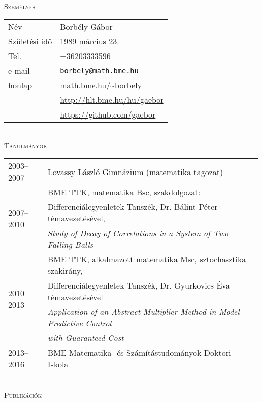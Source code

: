 \documentclass[12pt]{article}
\newcommand\mail[1]{\href{mailto:#1}{\texttt{#1}}}
\begin{document}
{ \ }
\\
\textsc{Személyes}
 \vspace{0.3cm}
 \\
       \begin{tabular}{p{3.5cm}l}
	       Név & Borbély Gábor \\
           Születési idő & 1989 március 23.\\
		   Tel. &  +36203333596\\
		   e-mail & \mail{borbely@math.bme.hu}\\
		   honlap & \url{math.bme.hu/~borbely} \\
                  & \url{http://hlt.bme.hu/hu/gaebor} \\
                  & \url{https://github.com/gaebor}
       \end{tabular}
 \vspace{0.3cm}
 \\
 \textsc{Tanulmányok}
 \vspace{0.3cm}
 \\
       \begin{tabular}{p{3.5cm}l}
	       2003--2007 & Lovassy László Gimnázium (matematika tagozat) \\
           \multirow{3}{*}[15pt]{2007--2010}& BME TTK, matematika Bsc, szakdolgozat: \\
		              & Differenciálegyenletek Tanszék, Dr. Bálint Péter témavezetésével, \\
					  & \emph{Study of Decay of Correlations in a System of Two Falling Balls} \\
		   \multirow{4}{*}[22pt]{2010--2013} & BME TTK, alkalmazott matematika Msc, sztochasztika szakirány,\\
						& Differenciálegyenletek Tanszék, Dr. Gyurkovics Éva témavezetésével \\
						& \emph{Application of an Abstract Multiplier Method in Model Predictive Control}\\ & \emph{ with Guaranteed Cost} \\
		    \multirow{3}{*}[15pt]{2013--2016} & BME Matematika- és Számítástudományok Doktori Iskola
       \end{tabular}
 \vspace{0.3cm}
 \\
 \textsc{Publikációk}
 \vspace{0.3cm}
 \\
\end{document}
